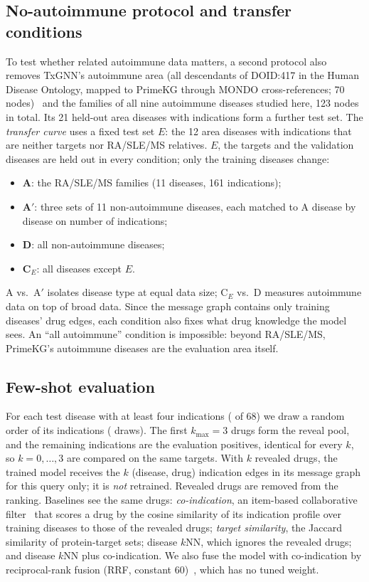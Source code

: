 \documentclass[journal]{IEEEtran}
\begin{document}
\subsection{No-autoimmune protocol and transfer conditions}
\label{sec:transferprotocol}
To test whether related autoimmune data matters, a second protocol also removes TxGNN's autoimmune area (all descendants of DOID:417 in the Human Disease Ontology, mapped to PrimeKG through MONDO cross-references; 70 nodes)~\cite{huang2024txgnn} and the families of all nine autoimmune diseases studied here, 123 nodes in total. Its 21 held-out area diseases with indications form a further test set. The \emph{transfer curve} uses a fixed test set $E$: the 12 area diseases with indications that are neither targets nor RA/SLE/MS relatives. $E$, the targets and the validation diseases are held out in every condition; only the training diseases change:
\begin{itemize}
\item \textbf{A}: the RA/SLE/MS families (11 diseases, 161 indications);
\item \textbf{A$'$}: three sets of 11 non-autoimmune diseases, each matched to A disease by disease on number of indications;
\item \textbf{D}: all \TrDNTrain{} non-autoimmune diseases;
\item \textbf{C$_E$}: all \TrCENTrain{} diseases except $E$.
\end{itemize}
A vs.\ A$'$ isolates disease type at equal data size; C$_E$ vs.\ D measures autoimmune data on top of broad data. Since the message graph contains only training diseases' drug edges, each condition also fixes what drug knowledge the model sees. An ``all autoimmune'' condition is impossible: beyond RA/SLE/MS, PrimeKG's autoimmune diseases are the evaluation area itself.

\subsection{Few-shot evaluation}
\label{sec:fewshotprotocol}
For each test disease with at least four indications (\FsN{} of 68) we draw a random order of its indications (\FsDraws{} draws). The first $k_{\max}=3$ drugs form the reveal pool, and the remaining indications are the evaluation positives, identical for every $k$, so $k=0,\dots,3$ are compared on the same targets. With $k$ revealed drugs, the trained model receives the $k$ (disease, drug) indication edges in its message graph for this query only; it is \emph{not} retrained. Revealed drugs are removed from the ranking. Baselines see the same drugs: \emph{co-indication}, an item-based collaborative filter~\cite{sarwar2001itemcf} that scores a drug by the cosine similarity of its indication profile over training diseases to those of the revealed drugs; \emph{target similarity}, the Jaccard similarity of protein-target sets; disease $k$NN, which ignores the revealed drugs; and disease $k$NN plus co-indication. We also fuse the model with co-indication by reciprocal-rank fusion (RRF, constant 60)~\cite{cormack2009rrf}, which has no tuned weight.
\end{document}
